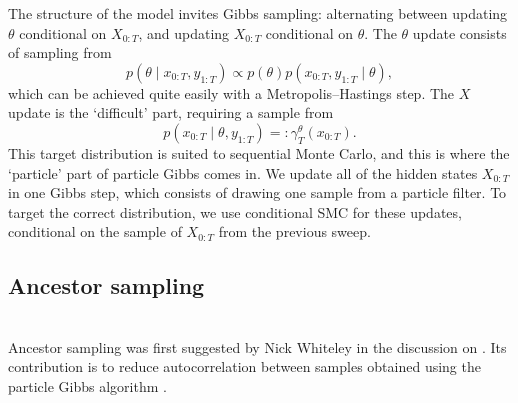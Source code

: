 The structure of the model invites Gibbs sampling: alternating between updating $\theta$ conditional on $X_{0:T}$, and updating $X_{0:T}$ conditional on $\theta$.
The $\theta$ update consists of sampling from 
\begin{equation*}
p(\theta \mid x_{0:T}, y_{1:T}) \propto p(\theta) p(x_{0:T}, y_{1:T} \mid \theta) ,
\end{equation*}
which can be achieved quite easily with a Metropolis--Hastings step.
The $X$ update is the `difficult' part, requiring a sample from
\begin{equation*}
p(x_{0:T} \mid \theta , y_{1:T}) =: \gamma_T^\theta(x_{0:T}) .
\end{equation*}
This target distribution is suited to sequential Monte Carlo, and this is where the `particle' part of particle Gibbs comes in.
We update all of the hidden states $X_{0:T}$ in one Gibbs step, which consists of drawing one sample from a particle filter. To target the correct distribution, we use conditional SMC for these updates, conditional on the sample of $X_{0:T}$ from the previous sweep. 




\subsection{Ancestor sampling \seb{$\sim$} }
\\

Ancestor sampling was first suggested by Nick Whiteley in the discussion on \textcite{andrieu2010}. Its contribution is to reduce autocorrelation between samples obtained using the particle Gibbs algorithm \parencite{andrieu2010}.

